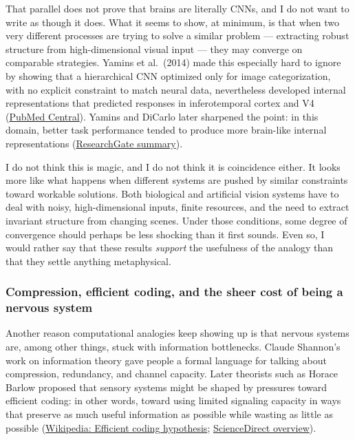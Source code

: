 That parallel does not prove that brains are literally CNNs, and I do not want to write as though it does. What it seems to show, at minimum, is that when two very different processes are trying to solve a similar problem --- extracting robust structure from high-dimensional visual input --- they may converge on comparable strategies. Yamins et al.~(2014) made this especially hard to ignore by showing that a hierarchical CNN optimized only for image categorization, with no explicit constraint to match neural data, nevertheless developed internal representations that predicted responses in inferotemporal cortex and V4 (\href{https://pmc.ncbi.nlm.nih.gov/articles/PMC5780340/}{PubMed Central}). Yamins and DiCarlo later sharpened the point: in this domain, better task performance tended to produce more brain-like internal representations (\href{https://www.researchgate.net/publication/295833538_Using_goal-driven_deep_learning_models_to_understand_sensory_cortex}{ResearchGate summary}).

I do not think this is magic, and I do not think it is coincidence either. It looks more like what happens when different systems are pushed by similar constraints toward workable solutions. Both biological and artificial vision systems have to deal with noisy, high-dimensional inputs, finite resources, and the need to extract invariant structure from changing scenes. Under those conditions, some degree of convergence should perhaps be less shocking than it first sounds. Even so, I would rather say that these results \emph{support} the usefulness of the analogy than that they settle anything metaphysical.

\subsubsection{Compression, efficient coding, and the sheer cost of being a nervous system}\label{03_it_started-compression-efficient-coding-and-the-sheer-cost-of-being-a-nervous-system}

Another reason computational analogies keep showing up is that nervous systems are, among other things, stuck with information bottlenecks. Claude Shannon's work on information theory gave people a formal language for talking about compression, redundancy, and channel capacity. Later theorists such as Horace Barlow proposed that sensory systems might be shaped by pressures toward efficient coding: in other words, toward using limited signaling capacity in ways that preserve as much useful information as possible while wasting as little as possible (\href{https://en.wikipedia.org/wiki/Efficient_coding_hypothesis}{Wikipedia: Efficient coding hypothesis}; \href{https://www.sciencedirect.com/science/article/pii/S0010027716300750}{ScienceDirect overview}).

